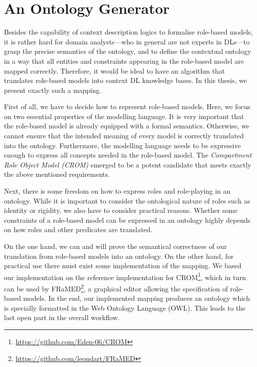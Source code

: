 \section{An Ontology Generator}
\label{sec:zweite-section}

Besides the capability of context description logics to formalise role-based models, it is rather
hard for domain analysts---who in general are not experts in DLs---to grasp the precise
semantics of the ontology, and to define the contextual ontology in a way that all entities and
constraints appearing in the role-based model are mapped correctly. Therefore, it would be ideal to
have an algorithm that translates role-based models into context DL knowledge bases.  In this thesis, we
present exactly such a mapping.

First of all, we have to decide how to represent role-based models. Here, we focus on two essential
properties of the modelling language. It is very important that the role-based model is already
equipped with a formal semantics. Otherwise, we cannot ensure that the intended meaning of every
model is correctly translated into the ontology. Furthermore, the modelling language needs to be
expressive enough to express all concepts needed in the role-based model.
%
The \emph{Compartment Role Object Model (CROM)}\cite{KuLG-SLE14,KBG-SLE15} emerged to be a potent
candidate that meets exactly the above mentioned requirements.

Next, there is some freedom on how to express roles and role-playing in an ontology. While it is
important to consider the ontological nature of roles such as identity or rigidity, we also have to
consider practical reasons. Whether some constraints of a role-based model can be expressed in an ontology
highly depends on how roles and other predicates are translated.

On the one hand, we can and will prove the semantical correctness of our translation from role-based
models into an \LMLO ontology. On the other hand, for practical use there must exist some
implementation of the mapping. We based our implementation on the reference implementation for
CROM\footnote{\url{https://github.com/Eden-06/CROM}}, which in turn can be used by
FRaMED\footnote{\url{https://github.com/leondart/FRaMED}}, a graphical editor allowing the
specification of role-based models. In the end, our implemented mapping produces an ontology which
is specially formatted in the Web Ontology Language (OWL).  This leads to the last open part in the
overall workflow.

